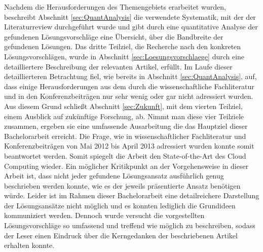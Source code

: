 Nachdem die Herausforderungen des Themengebiets \CC erarbeitet wurden, beschreibt Abschnitt \ref{sec:QuantAnalysis} die verwendete Systematik, mit der der Literaturreview durchgeführt wurde und gibt durch eine quantitative Analyse der gefundenen Lösungsvorschläge eine Übersicht, über die Bandbreite der gefundenen Lösungen.
Das dritte Teilziel, die Recherche nach den konkreten Lösungsvorschlägen, wurde in Abschnitt \ref{sec:Loesungsvorschlaege} durch eine detailliertere Beschreibung der relevanten Artikel, erfüllt.
\newline
Im Laufe dieser detaillierteren Betrachtung fiel, wie bereits in Abschnitt \ref{sec:QuantAnalysis}, auf, dass einige Herausforderungen aus dem \TCC durch die wissenschaftliche Fachliteratur und in den Konferenzbeiträgen nur sehr wenig oder gar nicht adressiert wurden. 
Aus diesem Grund schließt Abschnitt \ref{sec:Zukunft}, mit dem vierten Teilziel, einem Ausblick auf zukünftige Forschung, ab.
Nimmt man diese vier Teilziele zusammen, ergeben sie eine umfassende Ausarbeitung die das Hauptziel dieser Bachelorarbeit erreicht. 
Die Frage, wie \HiTCC in wissenschaftlicher Fachliteratur und Konferenzbeiträgen von Mai 2012 bis April 2013 adressiert wurden konnte somit beantwortet werden. 
Somit spiegelt die Arbeit den State-of-the-Art des Cloud Computing wieder.
\newline
Ein möglicher Kritikpunkt an der Vorgehensweise in dieser Arbeit ist, dass nicht jeder gefundene Lösungsansatz ausführlich genug beschrieben werden konnte, wie es der jeweils präsentierte Ansatz benötigen würde. Leider ist im Rahmen dieser Bachelorarbeit eine detailreichere Darstellung der Lösungsansätze nicht möglich und es konnten lediglich die Grundideen kommuniziert werden.
Dennoch wurde versucht die vorgestellten Lösungsvorschläge so umfassend und treffend wie möglich zu beschreiben, sodass der Leser einen Eindruck über die Kerngedanken der beschriebenen Artikel erhalten konnte.